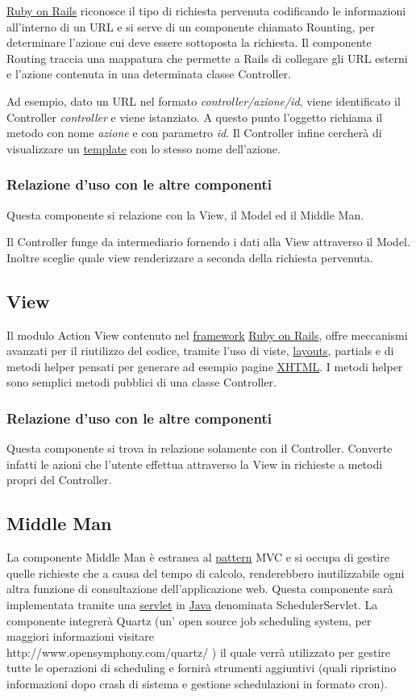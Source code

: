 \documentclass[11pt,a4paper]{article}
\begin{document}
\underline{Ruby on Rails} riconosce il tipo di richiesta pervenuta codificando le informazioni all'interno di un URL e si serve di un componente chiamato Rounting, per determinare l'azione cui deve essere sottoposta la richiesta.
Il componente Routing traccia una mappatura che permette a Rails di collegare gli URL esterni e l'azione contenuta in una determinata classe Controller.

Ad esempio, dato un URL nel formato \textit{controller/azione/id}, viene identificato il Controller \textit{controller} e viene istanziato. A questo punto l'oggetto richiama il metodo con nome \textit{azione} e con parametro \textit{id}. Il Controller infine cercherà di visualizzare un \underline{template} con lo stesso nome dell'azione. 
\subsubsection{Relazione d'uso con le altre componenti}
Questa componente si relazione con la View, il Model ed il Middle Man. 

Il Controller funge da intermediario fornendo i dati alla View attraverso il Model. Inoltre sceglie quale view renderizzare a seconda della richiesta pervenuta.

\subsection{View}\label{view}
 Il modulo Action View contenuto nel \underline{framework} \underline{Ruby on Rails}, offre meccanismi avanzati per il riutilizzo del codice, tramite l'uso di viste, \underline{layouts}, partials e di metodi helper pensati per generare ad esempio pagine \underline{XHTML}.
I metodi helper sono semplici metodi pubblici di una classe Controller.
\subsubsection{Relazione d'uso con le altre componenti}
Questa componente si trova in relazione solamente con il Controller. Converte infatti le azioni che l'utente effettua attraverso la View in richieste a metodi propri del Controller.
\subsection{Middle Man}
La componente Middle Man è estranea al \underline{pattern} MVC e si occupa di gestire quelle richieste che a causa del tempo di calcolo, renderebbero inutilizzabile ogni altra funzione di consultazione dell'applicazione web. 
Questa componente sarà implementata tramite una \underline{servlet} in \underline{Java} denominata SchedulerServlet.
La componente integrerà Quartz (un' open source job scheduling system, per maggiori informazioni visitare \\ http://www.opensymphony.com/quartz/ ) il quale verrà utilizzato per gestire tutte le operazioni di scheduling e fornirà strumenti aggiuntivi (quali ripristino informazioni dopo crash di sistema e gestione schedulazioni in formato cron).
\end{document}

